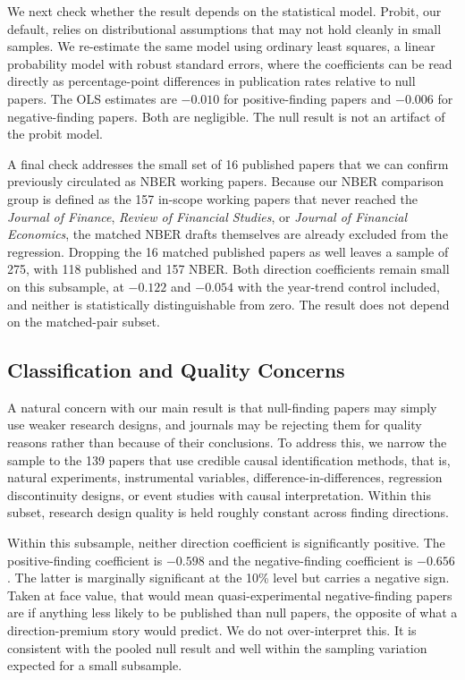 \documentclass[12pt]{article}
\newcommand{\JF}{\textit{Journal of Finance}}
\newcommand{\RFS}{\textit{Review of Financial Studies}}
\newcommand{\JFE}{\textit{Journal of Financial Economics}}
\begin{document}
We next check whether the result depends on the statistical model.
Probit, our default, relies on distributional assumptions that may
not hold cleanly in small samples.  We re-estimate the same model
using ordinary least squares, a linear probability model with robust
standard errors, where the coefficients can be read directly as
percentage-point differences in publication rates relative to null
papers.  The OLS estimates are $-0.010$ for positive-finding papers
and $-0.006$ for negative-finding papers.  Both are negligible.  The
null result is not an artifact of the probit model.

A final check addresses the small set of 16 published papers that we
can confirm previously circulated as NBER working papers.  Because
our NBER comparison group is defined as the 157 in-scope working
papers that never reached the \JF{}, \RFS{}, or \JFE{}, the matched
NBER drafts themselves are already excluded from the regression.
Dropping the 16 matched published papers as well leaves a sample of
275, with 118 published and 157 NBER.  Both direction coefficients
remain small on this subsample, at $-0.122$ and $-0.054$ with the
year-trend control included, and neither is statistically
distinguishable from zero.  The result does not depend on the
matched-pair subset.

\subsection{Classification and Quality Concerns}

A natural concern with our main result is that null-finding papers
may simply use weaker research designs, and journals may be
rejecting them for quality reasons rather than because of their
conclusions.  To address this, we narrow the sample to the 139
papers that use credible causal identification methods, that is,
natural experiments, instrumental variables, difference-in-differences,
regression discontinuity designs, or event studies with causal
interpretation.  Within this subset, research design quality is held
roughly constant across finding directions.

Within this subsample, neither direction coefficient is significantly
positive.  The positive-finding coefficient is $-0.598$ and the
negative-finding coefficient is $-0.656$.  The latter is marginally
significant at the 10\% level but carries a negative sign.
Taken at face value, that would mean quasi-experimental
negative-finding papers are if anything less likely to be published
than null papers, the opposite of what a direction-premium story
would predict.  We do not over-interpret this.  It is consistent
with the pooled null result and well within the sampling variation
expected for a small subsample.
\end{document}
